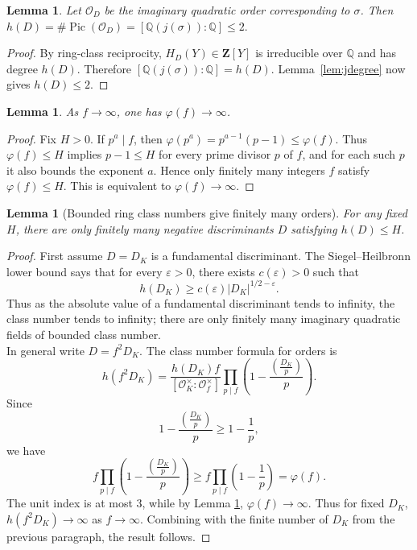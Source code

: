 \documentclass[11pt,a4paper]{amsart} %
\newtheorem{lemma}[theorem]{Lemma}
\theoremstyle{definition}
\newcommand{\Q}{\mathbb Q}
\newcommand{\Pic}{\operatorname{Pic}}
\begin{document}
\begin{lemma}\label{lem:h2}
Let \(\mathcal O_D\) be the imaginary quadratic order corresponding to \(\sigma\). Then $h(D)=\#\Pic(\mathcal O_D)=[\Q(j(\sigma)):\Q]\le2.$
\end{lemma}

\begin{proof}
By ring-class reciprocity, $H_D(Y)\in\mathbf Z[Y]$ is irreducible over $\Q$ and has degree $h(D)$.  Therefore
$[\Q(j(\sigma)):\Q]=h(D)$.  Lemma~\ref{lem:jdegree} now gives $h(D)\le2$.
\end{proof}

\begin{lemma}\label{lem:phi}
As $f\to\infty$, one has $\varphi(f)\to\infty$.
\end{lemma}

\begin{proof}
Fix $H>0$.  If $p^a\mid f$, then $\varphi(p^a)=p^{a-1}(p-1)\le \varphi(f)$. Thus $\varphi(f)\le H$ implies $p-1\le H$ for every prime divisor $p$ of $f$, and for each such $p$ it also bounds the exponent $a$.  Hence only finitely many integers $f$ satisfy $\varphi(f)\le H$.  This is equivalent to $\varphi(f)\to\infty$.
\end{proof}

\begin{lemma}[Bounded ring class numbers give finitely many orders]\label{lem:finiteD}
For any fixed \(H\), there are only finitely many negative discriminants \(D\) satisfying \(h(D)\le H\).
\end{lemma}

\begin{proof}
First assume \(D=D_K\) is a fundamental discriminant. The Siegel--Heilbronn lower bound says that for every \(\varepsilon>0\), there exists \(c(\varepsilon)>0\) such that
\[
h(D_K)\ge
c(\varepsilon)|D_K|^{1/2-\varepsilon}.
\]
Thus as the absolute value of a fundamental discriminant tends to infinity, the class number tends to infinity; there are only finitely many imaginary quadratic fields of bounded class number.\\
In general write $D=f^2D_K$. The class number formula for orders is
\[
h(f^2D_K)
=
\frac{h(D_K)f}
{[\mathcal O_K^\times:\mathcal O_f^\times]}
\prod_{p\mid f}
\left(1-\frac{(\frac{D_K}{p})}{p}\right).
\]
Since
\[
1-\frac{(\frac{D_K}{p})}{p}\ge1-\frac1p,
\]
we have
\[
f\prod_{p\mid f}
\left(1-\frac{(\frac{D_K}{p})}{p}\right)
\ge
f\prod_{p\mid f}\left(1-\frac1p\right)
=\varphi(f).
\]
The unit index is at most \(3\), while by Lemma \ref{lem:phi}, \(\varphi(f)\to\infty\). Thus for fixed \(D_K\), \(h(f^2D_K)\to\infty\) as \(f\to\infty\). Combining with the finite number of \(D_K\) from the previous paragraph, the result follows.
\end{proof}
\end{document}
